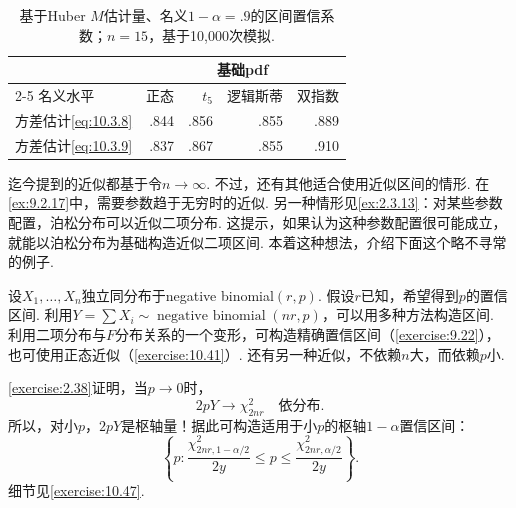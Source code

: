 \par\begin{table}[htbp]\centering
\caption{基于Huber $M$估计量、名义$1-\alpha=.9$的区间置信系数；$n=15$，基于10,000次模拟.}\label{tab:10.4.8}
\begin{tabular}{l|rrrr}\toprule
&\multicolumn{4}{c}{基础pdf}\\\cmidrule(lr){2-5}
名义水平&正态&$t_5$&逻辑斯蒂&双指数\\\midrule
方差估计\eqref{eq:10.3.8}&.844&.856&.855&.889\\
方差估计\eqref{eq:10.3.9}&.837&.867&.855&.910\\\bottomrule
\end{tabular}
\end{table}\par

迄今提到的近似都基于令$n\to\infty$. 不过，还有其他适合使用近似区间的情形. 在\autoref{ex:9.2.17}中，需要参数趋于无穷时的近似. 另一种情形见\autoref{ex:2.3.13}：对某些参数配置，泊松分布可以近似二项分布. 这提示，如果认为这种参数配置很可能成立，就能以泊松分布为基础构造近似二项区间. 本着这种想法，介绍下面这个略不寻常的例子.

\begin{example}[负二项区间]\label{ex:10.4.9}
设$X_1,\ldots,X_n$独立同分布于negative binomial$(r,p)$. 假设$r$已知，希望得到$p$的置信区间. 利用$Y=\sum X_i\sim\operatorname{negative\ binomial}(nr,p)$，可以用多种方法构造区间. 利用二项分布与$F$分布关系的一个变形，可构造精确置信区间（\autoref{exercise:9.22}），也可使用正态近似（\autoref{exercise:10.41}）. 还有另一种近似，不依赖$n$大，而依赖$p$小.

\autoref{exercise:2.38}证明，当$p\to0$时，
$$2pY\longrightarrow\chi_{2nr}^2\quad\text{依分布}.$$
所以，对小$p$，$2pY$是枢轴量！据此可构造适用于小$p$的枢轴$1-\alpha$置信区间：
$$\left\{p:\frac{\chi_{2nr,1-\alpha/2}^2}{2y}\leq p\leq\frac{\chi_{2nr,\alpha/2}^2}{2y}\right\}.$$
细节见\autoref{exercise:10.47}.
\end{example}
